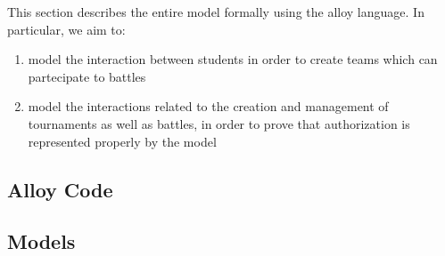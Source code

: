 This section describes the entire model formally using the alloy language.
In particular, we aim to:
\begin{enumerate}
      \item model the interaction between students
            in order to create teams which can partecipate to battles
      \item model the interactions related to the creation and management
            of tournaments as well as battles, in order to prove that
            authorization is represented properly by the model
\end{enumerate}

\subsection{Alloy Code}


\pagebreak
\subsection{Models}

